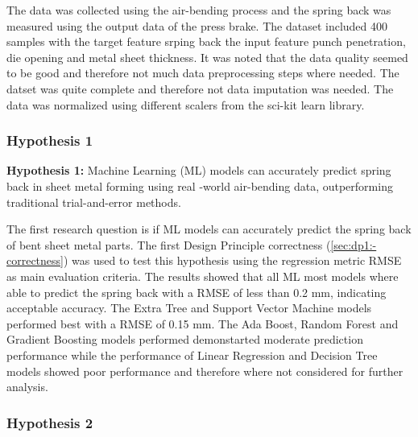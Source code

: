 The data was collected using the air-bending process and the spring back was measured using the output data of the
press brake.
The dataset included 400 samples with the target feature srping back the input feature punch penetration, die
opening and metal sheet thickness.
It was noted that the data quality seemed to be good and therefore not much data preprocessing steps where needed.
The datset was quite complete and therefore not data imputation was needed.
The data was normalized using different scalers from the sci-kit learn library.



\subsubsection{Hypothesis 1}

\textbf{Hypothesis 1:} Machine Learning (ML) models can accurately predict spring back in sheet metal forming using
real -world air-bending data, outperforming traditional trial-and-error methods.

The first research question is if \ac{ML} models can accurately predict the spring back of bent sheet metal parts.
The first Design Principle correctness (\ref{sec:dp1:-correctness}) was used to test this hypothesis using the
regression metric RMSE as main evaluation criteria.
The results showed that all \ac{ML} most models where able to predict the spring back with a RMSE of less than 0.2 mm,
indicating acceptable accuracy.
The Extra Tree and Support Vector Machine models performed best with a RMSE of 0.15 mm.
The Ada Boost, Random Forest and Gradient Boosting models performed demonstarted moderate prediction performance
while the performance of Linear Regression and Decision Tree models showed poor performance and therefore where not
considered for further analysis.

\subsubsection{Hypothesis 2}

